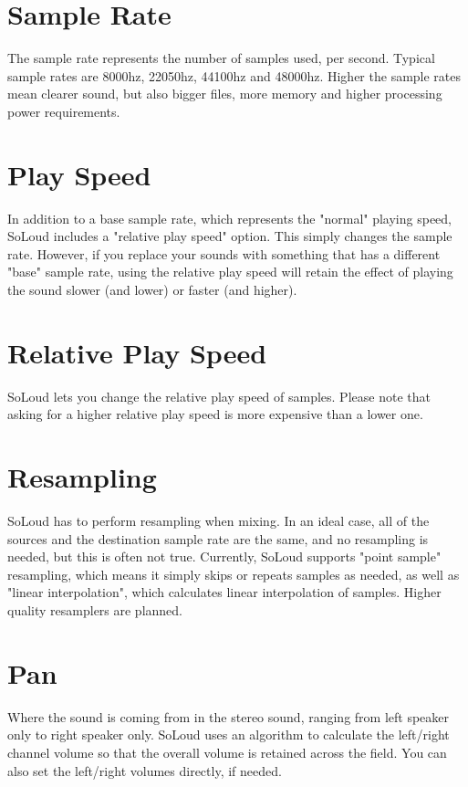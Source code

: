 \section{Sample Rate}

The sample rate represents the number of samples used, per second. Typical sample rates are 8000hz, 22050hz, 44100hz and 48000hz. Higher the sample rates mean clearer sound, but also bigger files, more memory and higher processing power requirements.

\section{Play Speed}

In addition to a base sample rate, which represents the "normal" playing speed, SoLoud includes a "relative play speed" option. This simply changes the sample rate. However, if you replace your sounds with something that has a different "base" sample rate, using the relative play speed will retain the effect of playing the sound slower (and lower) or faster (and higher).

\section{Relative Play Speed}

SoLoud lets you change the relative play speed of samples. Please note that asking for a higher relative play speed is more expensive than a lower one.

\section{Resampling}

SoLoud has to perform resampling when mixing. In an ideal case, all of the sources and the destination sample rate are the same, and no resampling is needed, but this is often not true. Currently, SoLoud supports "point sample" resampling, which means it simply skips or repeats samples as needed, as well as "linear interpolation", which calculates linear interpolation of samples. Higher quality resamplers are planned.

\section{Pan}

Where the sound is coming from in the stereo sound, ranging from left speaker only to right speaker only. SoLoud uses an algorithm to calculate the left/right channel volume so that the overall volume is retained across the field. You can also set the left/right volumes directly, if needed.

